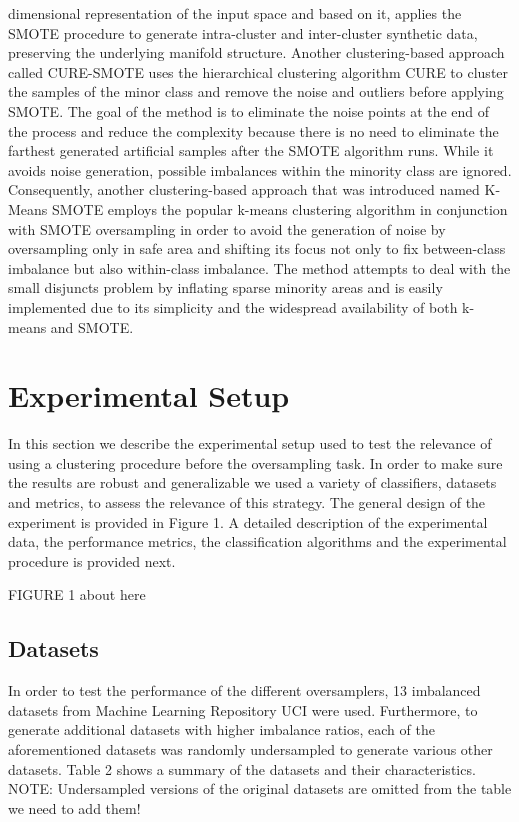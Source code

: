 \documentclass[parskip=full]{scrartcl}
\begin{document}
dimensional representation of the input space and based on it, applies the 
SMOTE procedure to generate intra-cluster and inter-cluster synthetic data, 
preserving the underlying manifold structure. Another clustering-based approach 
called CURE-SMOTE \cite{Ma2017} uses the hierarchical clustering algorithm CURE 
to cluster the samples of the minor class and remove the noise and outliers 
before applying SMOTE. The goal of the method is to eliminate the noise points 
at the end of the process and reduce the complexity because there is no need to 
eliminate the farthest generated artificial samples after the SMOTE algorithm 
runs. While it avoids noise generation, possible imbalances within the minority 
class are ignored. Consequently, another clustering-based approach that was 
introduced named K-Means SMOTE \cite{Douzas2018} employs the popular k-means 
clustering algorithm in conjunction with SMOTE oversampling in order to avoid 
the generation of noise by oversampling only in safe area and shifting its 
focus not only to fix between-class imbalance but also within-class imbalance. 
The method attempts to deal with the small disjuncts problem by inflating 
sparse minority areas and is easily implemented due to its simplicity and the 
widespread availability of both k-means and SMOTE.

\section{Experimental Setup}

In this section we describe the experimental setup used to test the relevance 
of using a clustering procedure before the oversampling task. In order to make 
sure the results are robust and generalizable we used a variety of classifiers, 
datasets and metrics, to assess the relevance of this strategy. The general 
design of the experiment is provided in Figure 1. A detailed description of the 
experimental data, the performance metrics, the classification algorithms and 
the experimental procedure is provided next.

FIGURE 1 about here

\subsection{Datasets} 

In order to test the performance of the different oversamplers, 13 imbalanced 
datasets from Machine Learning Repository UCI were used. Furthermore, to 
generate additional datasets with higher imbalance ratios, each of the 
aforementioned datasets was randomly undersampled to generate various other 
datasets. Table 2 shows a summary of the datasets and their characteristics.
NOTE: Undersampled versions of the original datasets are omitted from the table 
we need to add them!
\end{document}
